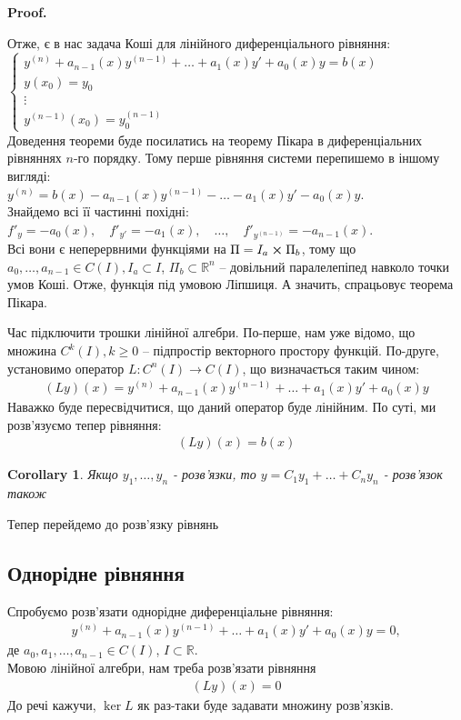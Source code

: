 \documentclass[a4paper, 10pt]{article}
\makeatletter
\def\qed{$\blacksquare$}
\theoremstyle{theoremdd}
\theoremstyle{theoremdd}
\theoremstyle{theoremdd}
\theoremstyle{theoremdd}
\theoremstyle{theoremdd}
\theoremstyle{theoremdd}
\theoremstyle{theoremdd}
\theoremstyle{theoremdd}
\newtheorem{corollary}[theorem]{Corollary}
\renewenvironment{proof}[1][Proof.\\]{\par
\pushQED{\hfill \qed}%
\normalfont \topsep6\p@\@plus6\p@\relax
\trivlist
\item\relax
{\bfseries
#1\@addpunct{.}}\hspace\labelsep\ignorespaces
}{%
\popQED\endtrivlist\@endpefalse
}
\makeatother
\begin{document}
	\begin{proof}
	Отже, є в нас задача Коші для лінійного диференціального рівняння:\\
	$\begin{cases}
	y^{(n)} + a_{n-1}(x)y^{(n-1)}+\dots+a_1(x)y'+a_0(x)y=b(x)\\
	y(x_0) = y_0\\
	\vdots\\
	y^{(n-1)}(x_0) = y_0^{(n-1)}
	\end{cases}
	$\\
	Доведення теореми буде посилатись на теорему Пікара в диференціальних рівняннях $n$-го порядку. Тому перше рівняння системи перепишемо в іншому вигляді:\\
	$y^{(n)} = b(x) - a_{n-1}(x)y^{(n-1)} - \dots - a_1(x)y' - a_0(x)y$.\\
	Знайдемо всі її частинні похідні:\\
	$f'_y = -a_0(x), \quad f'_{y'} = -a_1(x), \quad \dots, \quad f'_{y^{(n-1)}} = -a_{n-1}(x)$.\\
	Всі вони є неперервними функціями на $\Pi = I_a \cross \Pi_b$, тому що $a_0,\dots,a_{n-1} \in C(I), I_a \subset I$, $\Pi_b \subset \mathbb{R}^n$ -- довільний паралелепіпед навколо точки умов Коші. Отже, функція під умовою Ліпшиця. А значить, спрацьовує теорема Пікара.
\end{proof}

	Час підключити трошки лінійної алгебри. По-перше, нам уже відомо, що множина $C^k(I), k \geq 0$ -- підпростір векторного простору функцій. По-друге, установимо оператор $L \colon C^n(I) \to C(I)$, що визначається таким чином:
	\begin{align*}
	(Ly)(x) = y^{(n)} + a_{n-1}(x)y^{(n-1)}+\dots+a_1(x)y'+a_0(x)y
	\end{align*}
	Наважко буде пересвідчитися, що даний оператор буде лінійним. По суті, ми розв'язуємо тепер рівняння:
	\begin{align*}
	(Ly)(x) = b(x)
	\end{align*}

	\begin{corollary}
 Якщо $y_1, \dots, y_n$ - розв'язки, то $y=C_1y_1+\dots+C_n y_n$ - розв'язок також
 \end{corollary}
	Тепер перейдемо до розв'язку рівнянь
	
	\subsection{Однорідне рівняння}
	Спробуємо розв'язати однорідне диференціальне рівняння:
	\begin{align*}
	y^{(n)} + a_{n-1}(x)y^{(n-1)}+\dots+a_1(x)y'+a_0(x)y = 0,
	\end{align*}
	де $a_0, a_1,\dots,a_{n-1}\in C(I)$, $I \subset \mathbb{R}$.\\
	Мовою лінійної алгебри, нам треба розв'язати рівняння
	\begin{align*}
	(Ly)(x) = 0
	\end{align*}
	До речі кажучи, $\ker L$ як раз-таки буде задавати множину розв'язків.
	
\end{document}
